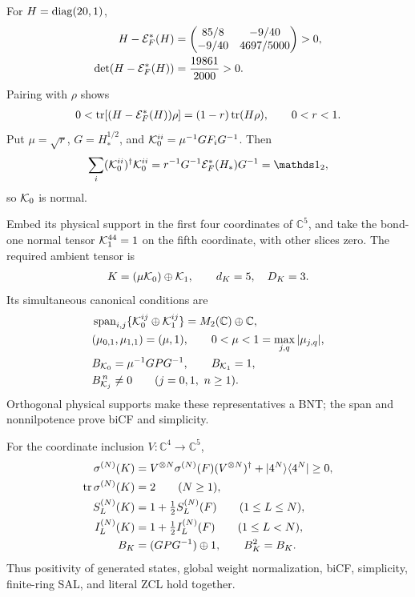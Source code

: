 \documentclass[aps,pra,reprint,nofootinbib,onecolumn]{revtex4-2}
\begin{document}
For $H=\operatorname{diag}(20,1)$,
\begin{align}
	H-\mathcal{E}_F^*(H)
	                     & =\begin{pmatrix}85/8&-9/40\\-9/40&4697/5000\end{pmatrix}>0,\nonumber \\
	\det(H-\mathcal{E}_F^*(H)) & =\frac{19861}{2000}>0.
	\label{eq:H-contraction-val}
\end{align}
Pairing with $\rho$ shows
\begin{align}
	0<\operatorname{tr}[(H-\mathcal{E}_F^*(H))\rho]
	=(1-r)\operatorname{tr}(H\rho),\qquad 0<r<1.
	\label{eq:r-strictly-less-1}
\end{align}
Put $\mu=\sqrt r$, $G=H_*^{1/2}$, and
$\mathcal{K}_0^{ii}=\mu^{-1}GF_iG^{-1}$. Then
\begin{align}
	\sum_i(\mc K_0^{ii})^\dagger\mc K_0^{ii}
	=r^{-1}G^{-1}\mc E_F^*(H_*)G^{-1}=\Id_2,
	\label{eq:K0-normal}
\end{align}
so $\mathcal{K}_0$ is normal.

Embed its physical support in the first four coordinates of
$\mathbb C^5$, and take the bond-one normal tensor
$\mathcal{K}_1^{44}=1$ on the fifth coordinate, with other slices zero.
The required ambient tensor is
\begin{align}
	K=(\mu\mathcal{K}_0)\oplus\mathcal{K}_1,\qquad d_K=5,\quad D_K=3.
	\label{eq:ambient}
\end{align}
Its simultaneous canonical conditions are
\begin{align}
	 & \operatorname{span}_{i,j}
	\{\mathcal{K}_0^{ij}\oplus\mathcal{K}_1^{ij}\}
	=M_2(\mathbb C)\oplus\mathbb C,\nonumber                       \\
	 & (\mu_{0,1},\mu_{1,1})=(\mu,1),\qquad
	0<\mu<1=\max_{j,q}|\mu_{j,q}|,\nonumber                        \\
	 & B_{\mathcal{K}_0}=\mu^{-1}GPG^{-1},\qquad B_{\mathcal{K}_1}=1,\nonumber \\
	 & B_{\mathcal{K}_j}^{\,n}\ne0\qquad(j=0,1,\ n\geq1).
	\label{eq:ambient-canonical-conds}
\end{align}
Orthogonal physical supports make these representatives a BNT;
the span and nonnilpotence prove biCF and simplicity.

For the coordinate inclusion $V:\mathbb C^4\to\mathbb C^5$,
\begin{align}
	\sigma^{(N)}(K)
	                   & =V^{\otimes N}\sigma^{(N)}(F)(V^{\otimes N})^\dagger
	+\lvert4^N\rangle\langle4^N\rvert\geq0,\nonumber                                           \\
	\operatorname{tr}\sigma^{(N)}(K) & =2\qquad(N\geq1),\nonumber                             \\
	S_L^{(N)}(K)       & =1+\tfrac12S_L^{(N)}(F)\qquad(1\leq L\leq N),\nonumber \\
	I_L^{(N)}(K)       & =1+\tfrac12I_L^{(N)}(F)\qquad(1\leq L<N),\nonumber     \\
	B_K                & =(GPG^{-1})\oplus1,\qquad B_K^2=B_K.
	\label{eq:ambient-verified}
\end{align}
Thus positivity of generated states, global weight normalization,
biCF, simplicity, finite-ring SAL, and literal ZCL hold together.
\end{document}

